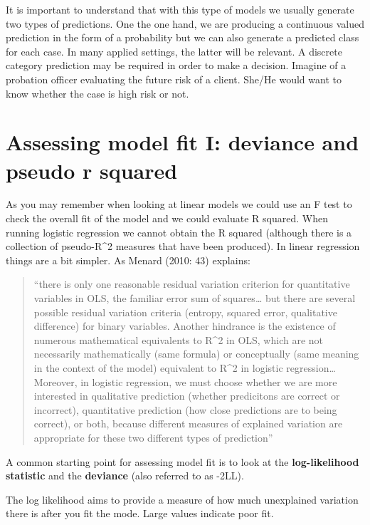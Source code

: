\documentclass[
]{book}
\begin{document}
It is important to understand that with this type of models we usually generate two types of predictions. One the one hand, we are producing a continuous valued prediction in the form of a probability but we can also generate a predicted class for each case. In many applied settings, the latter will be relevant. A discrete category prediction may be required in order to make a decision. Imagine of a probation officer evaluating the future risk of a client. She/He would want to know whether the case is high risk or not.

\section{Assessing model fit I: deviance and pseudo r squared}\label{assessing-model-fit-i-deviance-and-pseudo-r-squared}

As you may remember when looking at linear models we could use an F test to check the overall fit of the model and we could evaluate R squared. When running logistic regression we cannot obtain the R squared (although there is a collection of pseudo-R\^{}2 measures that have been produced). In linear regression things are a bit simpler. As Menard (2010: 43) explains:

\begin{quote}
``there is only one reasonable residual variation criterion for quantitative variables in OLS, the familiar error sum of squares\ldots{} but there are several possible residual variation criteria (entropy, squared error, qualitative difference) for binary variables. Another hindrance is the existence of numerous mathematical equivalents to R\^{}2 in OLS, which are not necessarily mathematically (same formula) or conceptually (same meaning in the context of the model) equivalent to R\^{}2 in logistic regression\ldots{} Moreover, in logistic regression, we must choose whether we are more interested in qualitative prediction (whether predicitons are correct or incorrect), quantitative prediction (how close predictions are to being correct), or both, because different measures of explained variation are appropriate for these two different types of prediction''
\end{quote}

A common starting point for assessing model fit is to look at the \textbf{log-likelihood statistic} and the \textbf{deviance} (also referred to as -2LL).

The log likelihood aims to provide a measure of how much unexplained variation there is after you fit the mode. Large values indicate poor fit.
\end{document}

